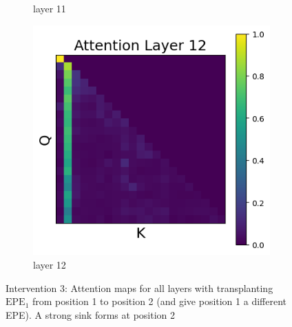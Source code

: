 \documentclass[11pt]{article}
\begin{document}
\begin{figure}[t]
\begin{subfigure}[t]{0.24\textwidth}
    \caption{layer 11}
  \end{subfigure}\hfill
  \begin{subfigure}[t]{0.24\textwidth}
    \centering
    \includegraphics[width=1.4\columnwidth]{figures/intervention3/layer_12.png}
    \caption{layer 12}
  \end{subfigure}\hfill

  \caption{Intervention 3: Attention maps for all layers with transplanting $\mathrm{EPE}_1$ from position 1 to position 2 (and give position 1 a different EPE). A strong sink forms at position 2}
\end{figure}
\end{document}
